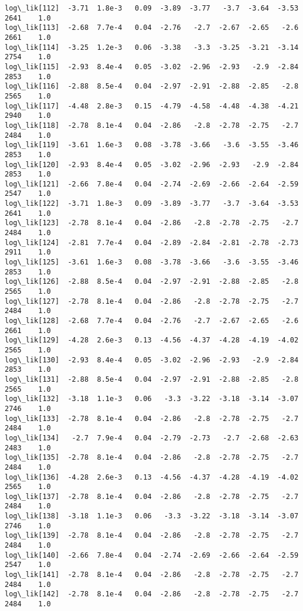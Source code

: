 \documentclass[11pt]{article}
\begin{document}
\begin{Verbatim}[commandchars=\\\{\}]
log\_lik[112]  -3.71  1.8e-3   0.09  -3.89  -3.77   -3.7  -3.64  -3.53   2641    1.0
log\_lik[113]  -2.68  7.7e-4   0.04  -2.76   -2.7  -2.67  -2.65   -2.6   2661    1.0
log\_lik[114]  -3.25  1.2e-3   0.06  -3.38   -3.3  -3.25  -3.21  -3.14   2754    1.0
log\_lik[115]  -2.93  8.4e-4   0.05  -3.02  -2.96  -2.93   -2.9  -2.84   2853    1.0
log\_lik[116]  -2.88  8.5e-4   0.04  -2.97  -2.91  -2.88  -2.85   -2.8   2565    1.0
log\_lik[117]  -4.48  2.8e-3   0.15  -4.79  -4.58  -4.48  -4.38  -4.21   2940    1.0
log\_lik[118]  -2.78  8.1e-4   0.04  -2.86   -2.8  -2.78  -2.75   -2.7   2484    1.0
log\_lik[119]  -3.61  1.6e-3   0.08  -3.78  -3.66   -3.6  -3.55  -3.46   2853    1.0
log\_lik[120]  -2.93  8.4e-4   0.05  -3.02  -2.96  -2.93   -2.9  -2.84   2853    1.0
log\_lik[121]  -2.66  7.8e-4   0.04  -2.74  -2.69  -2.66  -2.64  -2.59   2547    1.0
log\_lik[122]  -3.71  1.8e-3   0.09  -3.89  -3.77   -3.7  -3.64  -3.53   2641    1.0
log\_lik[123]  -2.78  8.1e-4   0.04  -2.86   -2.8  -2.78  -2.75   -2.7   2484    1.0
log\_lik[124]  -2.81  7.7e-4   0.04  -2.89  -2.84  -2.81  -2.78  -2.73   2911    1.0
log\_lik[125]  -3.61  1.6e-3   0.08  -3.78  -3.66   -3.6  -3.55  -3.46   2853    1.0
log\_lik[126]  -2.88  8.5e-4   0.04  -2.97  -2.91  -2.88  -2.85   -2.8   2565    1.0
log\_lik[127]  -2.78  8.1e-4   0.04  -2.86   -2.8  -2.78  -2.75   -2.7   2484    1.0
log\_lik[128]  -2.68  7.7e-4   0.04  -2.76   -2.7  -2.67  -2.65   -2.6   2661    1.0
log\_lik[129]  -4.28  2.6e-3   0.13  -4.56  -4.37  -4.28  -4.19  -4.02   2565    1.0
log\_lik[130]  -2.93  8.4e-4   0.05  -3.02  -2.96  -2.93   -2.9  -2.84   2853    1.0
log\_lik[131]  -2.88  8.5e-4   0.04  -2.97  -2.91  -2.88  -2.85   -2.8   2565    1.0
log\_lik[132]  -3.18  1.1e-3   0.06   -3.3  -3.22  -3.18  -3.14  -3.07   2746    1.0
log\_lik[133]  -2.78  8.1e-4   0.04  -2.86   -2.8  -2.78  -2.75   -2.7   2484    1.0
log\_lik[134]   -2.7  7.9e-4   0.04  -2.79  -2.73   -2.7  -2.68  -2.63   2483    1.0
log\_lik[135]  -2.78  8.1e-4   0.04  -2.86   -2.8  -2.78  -2.75   -2.7   2484    1.0
log\_lik[136]  -4.28  2.6e-3   0.13  -4.56  -4.37  -4.28  -4.19  -4.02   2565    1.0
log\_lik[137]  -2.78  8.1e-4   0.04  -2.86   -2.8  -2.78  -2.75   -2.7   2484    1.0
log\_lik[138]  -3.18  1.1e-3   0.06   -3.3  -3.22  -3.18  -3.14  -3.07   2746    1.0
log\_lik[139]  -2.78  8.1e-4   0.04  -2.86   -2.8  -2.78  -2.75   -2.7   2484    1.0
log\_lik[140]  -2.66  7.8e-4   0.04  -2.74  -2.69  -2.66  -2.64  -2.59   2547    1.0
log\_lik[141]  -2.78  8.1e-4   0.04  -2.86   -2.8  -2.78  -2.75   -2.7   2484    1.0
log\_lik[142]  -2.78  8.1e-4   0.04  -2.86   -2.8  -2.78  -2.75   -2.7   2484    1.0

\end{Verbatim}
\end{document}
